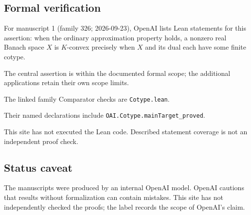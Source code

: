 \documentclass[11pt]{article}
\begin{document}
\subsection{Formal verification}
For manuscript 1 (family 326; 2026-09-23), OpenAI lists Lean statements for this assertion: when the ordinary approximation property holds, a nonzero real Banach space $X$ is $K$-convex precisely when $X$ and its dual each have some finite cotype.

The central assertion is within the documented formal scope; the additional applications retain their own scope limits.

The linked family Comparator checks are \texttt{Cotype.lean}.

Their named declarations include \texttt{OAI.Cotype.mainTarget\_proved}.

This site has not executed the Lean code. Described statement coverage is not an independent proof check.

\subsection{Status caveat}
The manuscripts were produced by an internal OpenAI model. OpenAI cautions that results without formalization can contain mistakes. This site has not independently checked the proofs; the label records the scope of OpenAI's claim.
\end{document}
